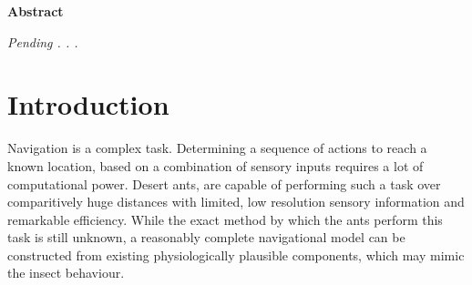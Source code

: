 \documentclass[a4paper,11pt,twoside,openright]{article}
\let\oldsection\section
\def\section{\cleardoublepage\oldsection}
\begin{document}
\newpage
\thispagestyle{empty}
\mbox{}
\newpage

\centering
{\LARGE\textbf{Abstract}}
\begin{flushleft}
  {\small \textit{Pending . . .}}
\end{flushleft}

\newpage

\tableofcontents
\newpage

\listoffigures
\newpage

\listoftables
\newpage
\thispagestyle{empty}
\mbox{}
\newpage


\raggedright
\section{ Introduction }
Navigation is a complex task. Determining a sequence of actions to reach a
known location, based on a combination of sensory inputs requires a lot of
computational power. Desert ants, are capable of performing such a task
over comparitively huge distances with limited, low resolution sensory
information and remarkable efficiency. While the exact method by which
the ants perform this task is still unknown, a reasonably complete navigational
model can be constructed from existing physiologically plausible components,
which may mimic the insect behaviour.
\newline
\par
\end{document}

